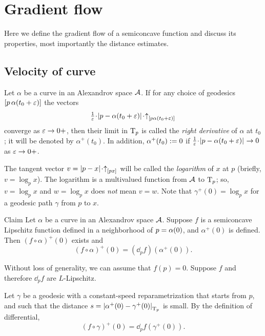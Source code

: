 
\chapter{Gradient flow}\label{chap:GF}

Here we define the gradient flow of a semiconcave function and discuss its properties,
most importantly the distance estimates.



\section{Velocity of curve}

Let $\alpha$ be a curve in an Alexandrov space $\mathcal{A}$.
If for any choice of 
geodesics $[p\,\alpha(t_0+\varepsilon)]$ the vectors 
\[\tfrac{1}{\eps}\cdot\dist{p}{\alpha(t_0+\eps)}{}\cdot\dir p{\alpha(t_0+\eps)}\]
converge as $\varepsilon\to 0+$, then their limit in $\mathrm{T}_p$ is called the \emph{right derivative} of $\alpha$ at $t_0$; it will be denoted by $\alpha^+(t_0)$.
In addition, $\alpha^+(t_0)\mathrel{:=}0$
if $\tfrac{1}{\eps}\cdot\dist{p}{\alpha(t_0+\eps)}{}\to 0$ as $\varepsilon\to 0+$.

The tangent vector $v=\dist px{}\cdot\dir px$ will be called the \emph{logarithm} of $x$ at $p$ (briefly, $v=\log_p x$).
The logarithm is a multivalued function from $\mathcal{A}$ to $\mathrm{T}_p$; so, $v=\log_p x$ and $w=\log_p x$ does \textit{not} mean $v=w$.
Note that $\gamma^+(0)=\log_px$ for a geodesic path $\gamma$ from $p$ to $x$.\label{page:log}

\begin{thm}{Claim}\label{clm:fa'=dfa'}
Let $\alpha$ be a curve in an Alexandrov space $\mathcal{A}$.
Suppose $f$ is a semiconcave Lipschitz function
defined in a neighborhood of $p=\alpha(0)$,
and $\alpha^+(0)$ is defined.
Then $(f\circ\alpha)^+(0)$ exists and 
\[(f\circ\alpha)^+(0)
=
(\dd_pf)(\alpha^+(0)).\]

\end{thm}

Without loss of generality, we can assume that $f(p)=0$.
Suppose $f$ and therefore $\dd_pf$ are $L$-Lipschitz.

Let $\gamma$ be a geodesic with a constant-speed reparametrization that starts from $p$, and
such that the distance
$s=|{\alpha^+(0)}-{\gamma^+(0)}|_{\mathrm{T}_p}^{{}}$
is small.
By the definition of differential,
\[(f\circ\gamma)^+(0)=\dd_pf(\gamma^+(0)).\]

